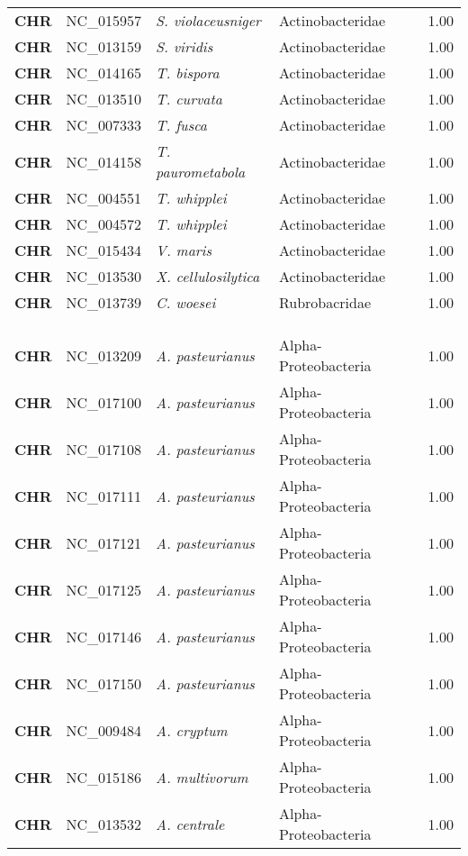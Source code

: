 \begin{adjustwidth}{-3cm}{2cm}
{\begin{supertabular}{>{\bfseries}l|p{0.1\textwidth}p{0.14\textwidth}l|l}
CHR & NC\_015957 & \textit{S. violaceusniger} & Actinobacteridae & 1.00\\
CHR & NC\_013159 & \textit{S. viridis} & Actinobacteridae & 1.00\\
CHR & NC\_014165 & \textit{T. bispora} & Actinobacteridae & 1.00\\
CHR & NC\_013510 & \textit{T. curvata} & Actinobacteridae & 1.00\\
CHR & NC\_007333 & \textit{T. fusca} & Actinobacteridae & 1.00\\
CHR & NC\_014158 & \textit{T. paurometabola} & Actinobacteridae & 1.00\\
CHR & NC\_004551 & \textit{T. whipplei} & Actinobacteridae & 1.00\\
CHR & NC\_004572 & \textit{T. whipplei} & Actinobacteridae & 1.00\\
CHR & NC\_015434 & \textit{V. maris} & Actinobacteridae & 1.00\\
CHR & NC\_013530 & \textit{X. cellulosilytica} & Actinobacteridae & 1.00\\
CHR & NC\_013739 & \textit{C. woesei} & Rubrobacridae & 1.00\\
\\
\\
\hline\\
CHR & NC\_013209 & \textit{A. pasteurianus} & Alpha-Proteobacteria & 1.00\\
CHR & NC\_017100 & \textit{A. pasteurianus} & Alpha-Proteobacteria & 1.00\\
CHR & NC\_017108 & \textit{A. pasteurianus} & Alpha-Proteobacteria & 1.00\\
CHR & NC\_017111 & \textit{A. pasteurianus} & Alpha-Proteobacteria & 1.00\\
CHR & NC\_017121 & \textit{A. pasteurianus} & Alpha-Proteobacteria & 1.00\\
CHR & NC\_017125 & \textit{A. pasteurianus} & Alpha-Proteobacteria & 1.00\\
CHR & NC\_017146 & \textit{A. pasteurianus} & Alpha-Proteobacteria & 1.00\\
CHR & NC\_017150 & \textit{A. pasteurianus} & Alpha-Proteobacteria & 1.00\\
CHR & NC\_009484 & \textit{A. cryptum} & Alpha-Proteobacteria & 1.00\\
CHR & NC\_015186 & \textit{A. multivorum} & Alpha-Proteobacteria & 1.00\\
CHR & NC\_013532 & \textit{A. centrale} & Alpha-Proteobacteria & 1.00\\

\end{supertabular}}
\end{adjustwidth}
